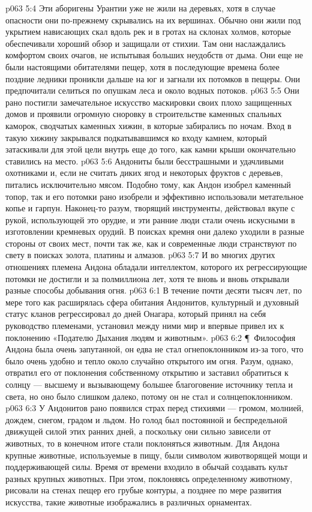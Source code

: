 \vs p063 5:4 Эти аборигены Урантии уже не жили на деревьях, хотя в случае опасности они по\hyp{}прежнему скрывались на их вершинах. Обычно они жили под укрытием нависающих скал вдоль рек и в гротах на склонах холмов, которые обеспечивали хороший обзор и защищали от стихии. Там они наслаждались комфортом своих очагов, не испытывая больших неудобств от дыма. Они еще не были настоящими обитателями пещер, хотя в последующие времена более поздние ледники проникли дальше на юг и загнали их потомков в пещеры. Они предпочитали селиться по опушкам леса и около водных потоков.
\vs p063 5:5 Они рано постигли замечательное искусство маскировки своих плохо защищенных домов и проявили огромную сноровку в строительстве каменных спальных каморок, сводчатых каменных хижин, в которые забирались по ночам. Вход в такую хижину закрывался подкатывавшимся ко входу камнем, который затаскивали для этой цели внутрь еще до того, как камни крыши окончательно ставились на место.
\vs p063 5:6 Андониты были бесстрашными и удачливыми охотниками и, если не считать диких ягод и некоторых фруктов с деревьев, питались исключительно мясом. Подобно тому, как Андон изобрел каменный топор, так и его потомки рано изобрели и эффективно использовали метательное копье и гарпун. Наконец\hyp{}то разум, творящий инструменты, действовал вкупе с рукой, использующей это орудие, и эти ранние люди стали очень искусными в изготовлении кремневых орудий. В поисках кремня они далеко уходили в разные стороны от своих мест, почти так же, как и современные люди странствуют по свету в поисках золота, платины и алмазов.
\vs p063 5:7 И во многих других отношениях племена Андона обладали интеллектом, которого их регрессирующие потомки не достигли и за полмиллиона лет, хотя те вновь и вновь открывали разные способы добывания огня.
\vs p063 6:1 В течение почти десяти тысяч лет, по мере того как расширялась сфера обитания Андонитов, культурный и духовный статус кланов регрессировал до дней Онагара, который принял на себя руководство племенами, установил между ними мир и впервые привел их к поклонению «Подателю Дыхания людям и животным».
\vs p063 6:2 \P\ Философия Андона была очень запутанной, он едва не стал огнепоклонником из\hyp{}за того, что было очень удобно и тепло около случайно открытого им огня. Разум, однако, отвратил его от поклонения собственному открытию и заставил обратиться к солнцу --- высшему и вызывающему большее благоговение источнику тепла и света, но оно было слишком далеко, потому он не стал и солнцепоклонником.
\vs p063 6:3 У Андонитов рано появился страх перед стихиями --- громом, молнией, дождем, снегом, градом и льдом. Но голод был постоянной и беспредельной движущей силой этих ранних дней, а поскольку они сильно зависели от животных, то в конечном итоге стали поклоняться животным. Для Андона крупные животные, используемые в пищу, были символом животворящей мощи и поддерживающей силы. Время от времени входило в обычай создавать культ разных крупных животных. При этом, поклоняясь определенному животному, рисовали на стенах пещер его грубые контуры, а позднее по мере развития искусства, такие животные изображались в различных орнаментах.
